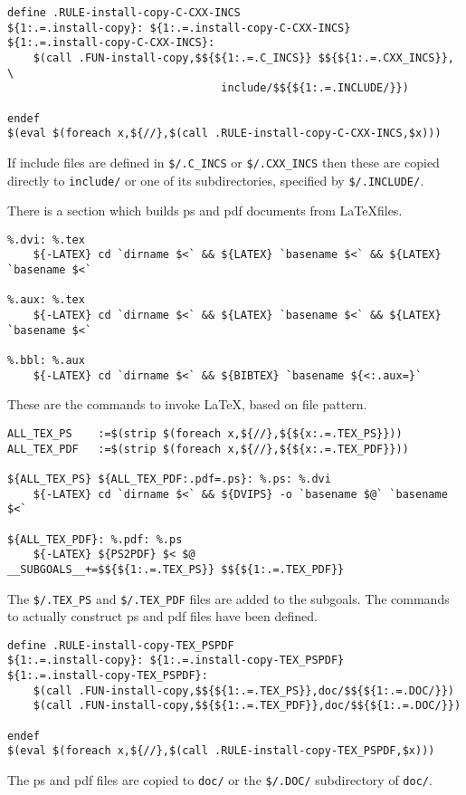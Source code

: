 \documentclass[letterpaper]{article}
\begin{document}
\begin{verbatim}
define .RULE-install-copy-C-CXX-INCS
${1:.=.install-copy}: ${1:.=.install-copy-C-CXX-INCS}
${1:.=.install-copy-C-CXX-INCS}:
	$(call .FUN-install-copy,$${${1:.=.C_INCS}} $${${1:.=.CXX_INCS}}, \
                                 include/$${${1:.=.INCLUDE/}})

endef
$(eval $(foreach x,${//},$(call .RULE-install-copy-C-CXX-INCS,$x)))
\end{verbatim}
If include files are defined in \verb+$/.C_INCS+ or \verb+$/.CXX_INCS+
then these are copied directly to \verb+include/+ or one of its
subdirectories, specified by \verb+$/.INCLUDE/+.

There is a section which builds ps and pdf documents from
\LaTeX files.
\begin{verbatim}
%.dvi: %.tex
	${-LATEX} cd `dirname $<` && ${LATEX} `basename $<` && ${LATEX} `basename $<`

%.aux: %.tex
	${-LATEX} cd `dirname $<` && ${LATEX} `basename $<` && ${LATEX} `basename $<`

%.bbl: %.aux
	${-LATEX} cd `dirname $<` && ${BIBTEX} `basename ${<:.aux=}`
\end{verbatim}
These are the commands to invoke \LaTeX, based on file pattern.

\begin{verbatim}
ALL_TEX_PS    :=$(strip $(foreach x,${//},${${x:.=.TEX_PS}}))
ALL_TEX_PDF   :=$(strip $(foreach x,${//},${${x:.=.TEX_PDF}}))

${ALL_TEX_PS} ${ALL_TEX_PDF:.pdf=.ps}: %.ps: %.dvi
	${-LATEX} cd `dirname $<` && ${DVIPS} -o `basename $@` `basename $<`

${ALL_TEX_PDF}: %.pdf: %.ps
	${-LATEX} ${PS2PDF} $< $@
__SUBGOALS__+=$${${1:.=.TEX_PS}} $${${1:.=.TEX_PDF}}
\end{verbatim}
The \verb+$/.TEX_PS+ and \verb+$/.TEX_PDF+ files are added to the
subgoals.  The commands to actually construct ps and pdf files 
have been defined.

\begin{verbatim}
define .RULE-install-copy-TEX_PSPDF
${1:.=.install-copy}: ${1:.=.install-copy-TEX_PSPDF}
${1:.=.install-copy-TEX_PSPDF}:
	$(call .FUN-install-copy,$${${1:.=.TEX_PS}},doc/$${${1:.=.DOC/}})
	$(call .FUN-install-copy,$${${1:.=.TEX_PDF}},doc/$${${1:.=.DOC/}})

endef
$(eval $(foreach x,${//},$(call .RULE-install-copy-TEX_PSPDF,$x)))
\end{verbatim}
The ps and pdf files are copied to \verb+doc/+ or the
\verb+$/.DOC/+ subdirectory of \verb+doc/+.
\end{document}
